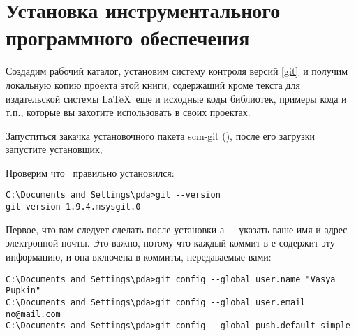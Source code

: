 
\section{Установка инструментального программного обеспечения}


Создадим рабочий каталог, установим систему контроля версий \git\ref{git}\ и 
получим локальную копию проекта этой книги, содержащий кроме текста для издательской системы
\LaTeX\ еще и исходные коды библиотек, примеры кода и т.п., которые вы захотите
использовать в своих проектах.


\bigskip{}

Запуститься закачка установочного пакета scm-git (), после его загрузки
запустите установщик, 

\bigskip
{}

\bigskip
{} 

\bigskip
{}

\bigskip
{}

\bigskip
{}

\bigskip
{}

\bigskip
{}

\bigskip
{}

\bigskip
Проверим что \git\ правильно установился:

\bigskip{}

\bigskip
\begin{lstlisting}[style=con]
C:\Documents and Settings\pda>git --version
git version 1.9.4.msysgit.0
\end{lstlisting}

\bigskip
Первое, что вам следует сделать после установки \git а\ ---указать ваше имя и
адрес электронной почты. Это важно, потому что каждый коммит в \git е содержит
эту информацию, и она включена в коммиты, передаваемые вами:
\begin{lstlisting}[style=con]
C:\Documents and Settings\pda>git config --global user.name "Vasya Pupkin"
C:\Documents and Settings\pda>git config --global user.email no@mail.com
C:\Documents and Settings\pda>git config --global push.default simple
\end{lstlisting}

